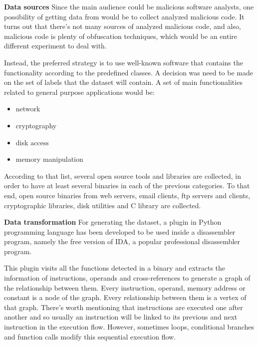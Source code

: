 \textbf{Data sources}
Since the main audience could be malicious software analysts, one possibility of getting data from would be to collect analyzed malicious code. It turns out that there's not many sources of analyzed malicious code, and also, malicious code is plenty of obfuscation techniques, which would be an entire different experiment to deal with. 

Instead, the preferred strategy is to use well-known software that contains the functionality according to the predefined classes. A decision was need to be made on the set of labels that the dataset will contain. A set of main functionalities related to general purpose applications would be:
\begin{itemize}
	\item network
	\item cryptography
	\item disk access
	\item memory manipulation
\end{itemize}
According to that list, several open source tools and libraries are collected, in order to have at least several binaries in each of the previous categories. To that end, open source binaries from web servers, email clients, ftp servers and clients, cryptographic libraries, disk utilities and C library are collected.





\textbf{Data transformation}
For generating the dataset, a plugin in Python programming language has been developed to be used inside a disassembler program, namely the free version of IDA, a popular professional disassembler program.


This plugin visits all the functions detected in a binary and extracts the information of instructions, operands and cross-references to generate a graph of the relationship between them. Every instruction, operand, memory address or constant is a node of the graph. Every relationship between them is a vertex of that graph. There's worth mentioning that instructions are executed one after another and so usually an instruction will be linked to its previous and next instruction in the execution flow. However, sometimes loops, conditional branches and function calls modify this sequential execution flow.

